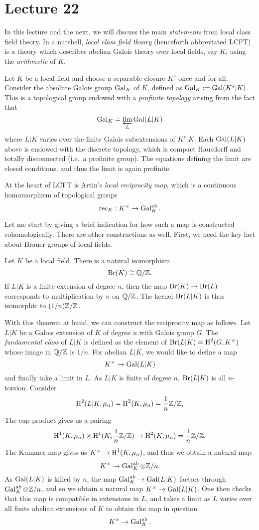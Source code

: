 \section{Lecture 22}

In this lecture and the next, we will discuss the main \emph{statements} from local class field theory.
In a nutshell, \emph{local class field theory} (henceforth abbreviated LCFT) is a theory which describes abelian Galois theory over local fields, say $K$, using the \emph{arithmetic} of $K$.

Let $K$ be a local field and choose a separable closure $K^{s}$ once and for all.
Consider the absolute Galois group $\operatorname{Gal}_{K}$ of $K$, defined as $\operatorname{Gal}_{K} := \operatorname{Gal}(K^{s}|K)$.
This is a topological group endowed with a \emph{profinite topology} arising from the fact that
\[ \operatorname{Gal}_{K} = \varprojlim_{L}\operatorname{Gal}(L|K) \]
where $L|K$ varies over the finite Galois subextensions of $K^{s}|K$.
Each $\operatorname{Gal}(L|K)$ above is endowed with the discrete topology, which is compact Hausdorff and totally disconnected (i.e.~a profinite group).
The equations defining the limit are closed conditions, and thus the limit is again profinite.

At the heart of LCFT is Artin's \emph{local reciprocity map}, which is a continuous homomorphism of topological groups
\[ \operatorname{rec}_{K} : K^{\times} \to \operatorname{Gal}_{K}^{\mathrm{ab}}. \]

Let me start by giving a brief indication for how such a map is constructed cohomologically.
There are other constructions as well.
First, we need the key fact about Brauer groups of local fields.
\begin{theorem}
  Let $K$ be a local field.
  There is a natural isomorphism
  \[ \operatorname{Br}(K) \cong \mathbb{Q}/\mathbb{Z}. \]
  If $L|K$ is a finite extension of degree $n$, then the map $\operatorname{Br}(K) \to \operatorname{Br}(L)$ corresponds to multiplication by $n$ on $\mathbb{Q}/\mathbb{Z}$.
  The kernel $\operatorname{Br}(L|K)$ is thus isomorphic to $(1/n)\mathbb{Z}/\mathbb{Z}$.
\end{theorem}

With this theorem at hand, we can construct the reciprocity map as follows.
Let $L|K$ be a Galois extension of $K$ of degree $n$ with Galois group $G$.
The \emph{fundamental class} of $L|K$ is defined as the element of $\operatorname{Br}(L|K) = \operatorname{H}^{2}(G,K^{\times})$ whose image in $\mathbb{Q}/\mathbb{Z}$ is $1/n$.
For abelian $L|K$, we would like to define a map
\[ K^{\times} \to \operatorname{Gal}(L|K) \]
and finally take a limit in $L$.
As $L|K$ is finite of degree $n$, $\operatorname{Br}(L|K)$ is all $n$-torsion.
Consider
\[ \operatorname{H}^{2}(L|K,\mu_{n}) = \operatorname{H}^{2}(K,\mu_{n}) = \frac{1}{n}\mathbb{Z}/\mathbb{Z}, \]
The cup product gives us a pairing
\[ \operatorname{H}^{1}(K,\mu_{n}) \times \operatorname{H}^{1}(K,\frac{1}{n}\mathbb{Z}/\mathbb{Z}) \to \operatorname{H}^{2}(K,\mu_{n}) = \frac{1}{n}\mathbb{Z}/\mathbb{Z}. \]
The Kummer map gives us $K^{\times} \to \operatorname{H}^{1}(K,\mu_{n})$, and thus we obtain a natural map
\[ K^{\times} \to \operatorname{Gal}_{K}^{\mathrm{ab}} \otimes \mathbb{Z}/n. \]
As $\operatorname{Gal}(L|K)$ is killed by $n$, the map $\operatorname{Gal}_{K}^{\mathrm{ab}} \to \operatorname{Gal}(L|K)$ factors through $\operatorname{Gal}_{K}^{\mathrm{ab}} \otimes \mathbb{Z}/n$, and so we obtain a natural map $K^{\times} \to \operatorname{Gal}(L|K)$.
One then checks that this map is compatible in extensions in $L$, and takes a limit as $L$ varies over all finite abelian extensions of $K$ to obtain the map in question
\[ K^{\times} \to \operatorname{Gal}_{K}^{\mathrm{ab}}. \]

